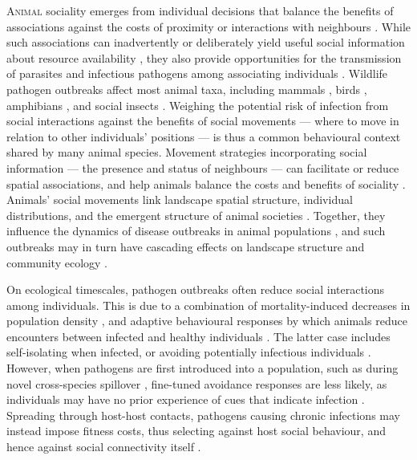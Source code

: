 
\newrefcontext[sorting=ynt]

\lettrine{A}{nimal} sociality emerges from individual decisions that balance the benefits of associations against the costs of proximity or interactions with neighbours \autocite[][]{tanner2012,webber2018,webber2022,gil2018}.
While such associations can inadvertently or deliberately yield useful social information about resource availability \autocite{danchin2004,dall2005,gil2018}, they also provide opportunities for the transmission of parasites and infectious pathogens among associating individuals \autocite[][]{weinstein2018,romano2020,albery2021,cantor2021,romano2021}.
Wildlife pathogen outbreaks affect most animal taxa, including mammals \autocite{blehert2009,fereidouni2019,chandler2021,kuchipudi2022}, birds \autocite{wille2022}, amphibians \autocite{scheele2019}, and social insects \autocite{goulson2015}.
Weighing the potential risk of infection from social interactions against the benefits of social movements --- where to move in relation to other individuals' positions --- is thus a common behavioural context shared by many animal species.
Movement strategies incorporating social information --- the presence and status of neighbours --- can facilitate or reduce spatial associations, and help animals balance the costs and benefits of sociality \autocite{albery2021,gil2018,webber2018,webber2022}.
Animals' social movements link landscape spatial structure, individual distributions, and the emergent structure of animal societies \autocite{gil2018,webber2022,kurvers2014}.
Together, they influence the dynamics of disease outbreaks in animal populations \autocite{white2018a,romano2020,romano2021,keeling2001}, and such outbreaks may in turn have cascading effects on landscape structure and community ecology \autocite{monk2022}.

On ecological timescales, pathogen outbreaks often reduce social interactions among individuals.
This is due to a combination of mortality-induced decreases in population density \autocite[e.g.][]{fereidouni2019,monk2022}, and adaptive behavioural responses by which animals reduce encounters between infected and healthy individuals \autocite{stroeymeyt2018,pusceddu2021,stockmaier2021,weinstein2018}.
The latter case includes self-isolating when infected, or avoiding potentially infectious individuals \autocite{stroeymeyt2018,pusceddu2021,stockmaier2021,weinstein2018}.
However, when pathogens are first introduced into a population, such as during novel cross-species spillover \autocite{kuchipudi2022,chandler2021}, fine-tuned avoidance responses are less likely, as individuals may have no prior experience of cues that indicate infection \autocite{weinstein2018,stockmaier2021}.
Spreading through host-host contacts, pathogens causing chronic infections \autocite{bastos2000,jolles2021,vosloo2009} may instead impose fitness costs, thus selecting against host social behaviour, and hence against social connectivity itself \autocite{altizer2003,cantor2021,romano2021,poulin2021,ashby2022}.

